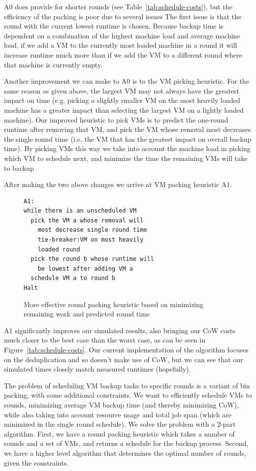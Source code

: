 {A0 does provide for shorter rounds (see Table~\ref{tab:schedule-costs}), but
the efficiency of the packing is poor due to several issues
The first issue is that the round with the current lowest runtime
is chosen. Because backup time is dependent on a combination of the highest
machine load and average machine load, if we add a VM to the currently most
loaded machine in a round it will increase runtime much more than if we add the
VM to a different round where that machine is currently empty. 


Another improvement we can make to A0 is to the VM picking heuristic. For the
same reason as given above, the largest VM may not always have the greatest
impact on time (e.g. picking a slightly smaller VM on the most heavily loaded
machine has a greater impact than selecting the largest VM on a lightly loaded
machine). Our improved heuristic to pick VMs is to predict the one-round
runtime after removing that VM, and pick the VM whose removal most
decreases the single round time (i.e. the VM that has the greatest impact on
overall backup time). By picking VMs this way we take into account
the machine load in picking which VM to schedule next, and minimize the time
the remaining VMs will take to backup

After making the two above changes we arrive at VM packing heuristic A1.

\begin{figure}
\begin{lstlisting}[frame=single]
A1:
while there is an unscheduled VM
  pick the VM a whose removal will
    most decrease single round time
    tie-breaker:VM on most heavily
    loaded round
  pick the round b whose runtime will
    be lowest after adding VM a
  schedule VM a to round b
Halt
\end{lstlisting}
\caption{More effective round packing heuristic based on minimizing remaining work and predicted round time}
\end{figure}

A1 significantly improves our simulated results, also bringing our CoW costs
much closer to the best case than the worst case, as can be seen in
Figure~\ref{tab:schedule-costs}.  Our current implementation of the algorithm
focuses on the deduplication and so doesn't make use of CoW, but we can see
that our simulated times closely match measured runtimes (hopefully).


The problem of scheduling VM backup tasks to specific rounds is a variant of
bin packing, with some additional constraints. We want to efficiently schedule
VMs to rounds, minimizing average VM backup time (and thereby minimizing CoW),
while also taking into account resource usage and total job span (which are
minimized in the single round schedule). We solve the problem with a 2-part
algorithm. First, we have a round packing heuristic which takes a number of
rounds and a set of VMs, and returns a schedule for the backup process. Second,
we have a higher level algorithm that determines the optimal number of rounds,
given the constraints.




}
